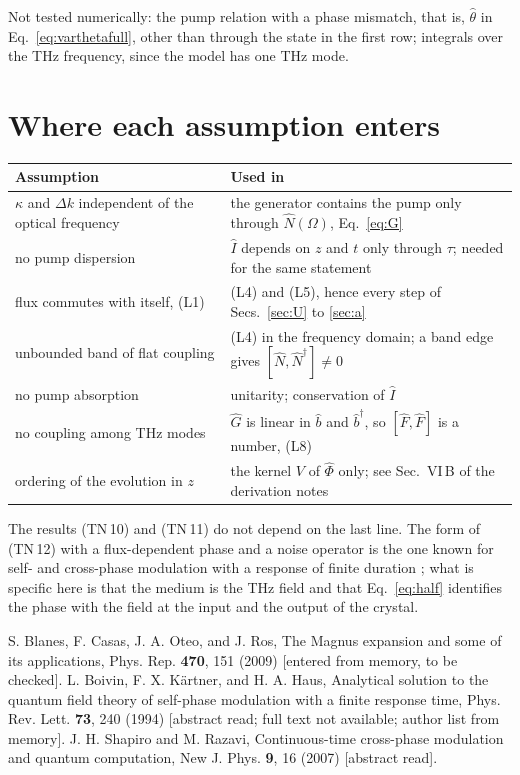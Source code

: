 \documentclass[aps,pra,onecolumn,notitlepage,11pt,amsmath,amssymb,nofootinbib]{revtex4-2}
\newcommand{\Nop}{\hat N}
\newcommand{\Iop}{\hat I}
\begin{document}
Not tested numerically: the pump relation with a phase mismatch, that is,
$\hat\theta$ in Eq.~\eqref{eq:varthetafull}, other than through the state in
the first row; integrals over the THz frequency, since the model has one THz
mode.

\section{Where each assumption enters}

\begin{center}
\begin{tabular}{R{0.36\textwidth}R{0.57\textwidth}}
\hline\hline
Assumption & Used in\\
\hline
$\kappa$ and $\Delta k$ independent of the optical frequency & the generator contains the pump only through $\Nop(\Omega)$, Eq.~\eqref{eq:G}\\[4pt]
no pump dispersion & $\Iop$ depends on $z$ and $t$ only through $\tau$; needed for the same statement\\[4pt]
flux commutes with itself, (L1) & (L4) and (L5), hence every step of Secs.~\ref{sec:U} to \ref{sec:a}\\[4pt]
unbounded band of flat coupling & (L4) in the frequency domain; a band edge gives $[\Nop,\Nop^\dagger]\neq0$\\[4pt]
no pump absorption & unitarity; conservation of $\Iop$\\[4pt]
no coupling among THz modes & $\hat G$ is linear in $\hat b$ and $\hat b^\dagger$, so $[\hat F,\hat F]$ is a number, (L8)\\[4pt]
ordering of the evolution in $z$ & the kernel $V$ of $\hat\Phi$ only; see Sec.~VI\,B of the derivation notes\\
\hline\hline
\end{tabular}
\end{center}

The results (TN\,10) and (TN\,11) do not depend on the last line. The form of
(TN\,12) with a flux-dependent phase and a noise operator is the one known
for self- and cross-phase modulation with a response of finite duration
\cite{boivin1994,shapirorazavi2007}; what is specific here is that the medium
is the THz field and that Eq.~\eqref{eq:half} identifies the phase with the
field at the input and the output of the crystal.

\begin{thebibliography}{9}
 S. Blanes, F. Casas, J. A. Oteo, and J. Ros, The Magnus
expansion and some of its applications, Phys. Rep. \textbf{470}, 151 (2009)
[entered from memory, to be checked].
 L. Boivin, F. X. K\"artner, and H. A. Haus, Analytical
solution to the quantum field theory of self-phase modulation with a finite
response time, Phys. Rev. Lett. \textbf{73}, 240 (1994) [abstract read; full
text not available; author list from memory].
 J. H. Shapiro and M. Razavi, Continuous-time
cross-phase modulation and quantum computation, New J. Phys. \textbf{9}, 16
(2007) [abstract read].
\end{thebibliography}
\end{document}
